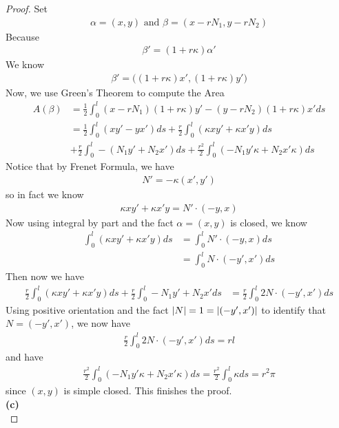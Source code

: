 \documentclass{report}
\begin{document}
\begin{proof}
Set 
\begin{align*}
\alpha =(x,y)\text{ and }\beta =(x-r N_1,y-rN_2)
\end{align*}
Because 
\begin{align*}
\beta '=(1+ r\kappa)\alpha ' 
\end{align*}
We know 
\begin{align*}
\beta ' =\Big((1+r\kappa)x',(1+r\kappa)y' \Big)
\end{align*}
Now, we use Green's Theorem to compute the Area 
\begin{align*}
A(\beta )&=\frac{1}{2}\int_0^l (x-rN_1)(1+r\kappa)y' -(y-rN_2)(1+r\kappa)x'ds\\
         &=\frac{1}{2}\int_0^l (xy'-yx') ds + \frac{r}{2}\int_0^l (\kappa xy' + \kappa x'y) ds \\
&+ \frac{r}{2}\int_0^l -(N_1y'+N_2x')ds + \frac{r^2}{2}\int_0^l (-N_1y'\kappa+N_2x'\kappa)ds
\end{align*}
Notice that by Frenet Formula, we have
\begin{align*}
N'=- \kappa (x',y')
\end{align*}
so in fact we know 
\begin{align*}
\kappa xy'+\kappa x'y=N'\cdot (-y,x)
\end{align*}
Now using integral by part and the fact $\alpha =(x,y)$ is closed, we know  
\begin{align*}
\int_0^l (\kappa xy'+\kappa x'y)ds&=\int_0^l N' \cdot (-y,x)ds\\
&=\int_0^l N\cdot (-y',x')ds
\end{align*}
Then now we have 
\begin{align*}
  \frac{r}{2}\int_0^l (\kappa xy'+\kappa x'y)ds+\frac{r}{2}\int_0^l -N_1y'+N_2x'ds&=\frac{r}{2}\int_0^l 2N\cdot (-y',x')ds
\end{align*}
Using positive orientation and the fact $\left|N\right|=1=\left|(-y',x')\right|$ to identify that $N=(-y',x')$, we now have 
\begin{align*}
\frac{r}{2}\int_0^l 2N \cdot (-y',x')ds=rl
\end{align*}
and have 
\begin{align*}
\frac{r^2}{2}\int_0^l (-N_1y'\kappa+N_2x' \kappa)ds=\frac{r^2}{2}\int_0^l \kappa ds =r^2 \pi 
\end{align*}
since $(x,y)$ is simple closed. This finishes the proof. \\

\textbf{(c)}\\


\end{proof}
\end{document}
